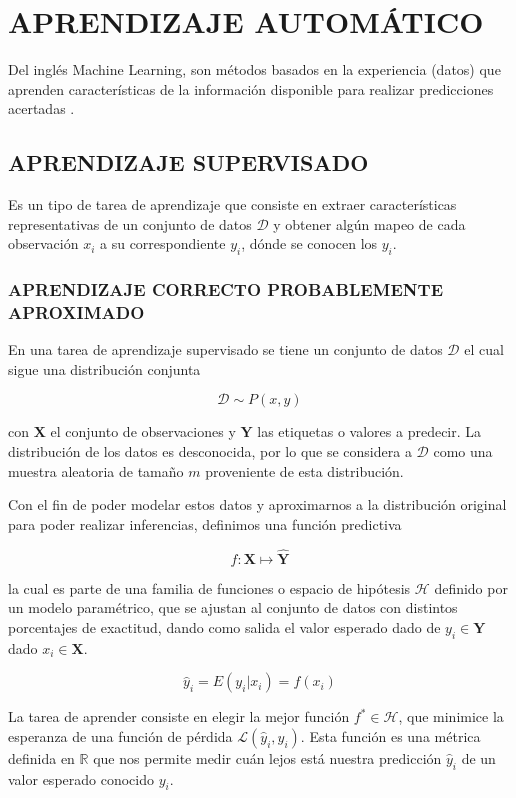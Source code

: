\section{APRENDIZAJE AUTOMÁTICO}
    Del inglés Machine Learning, son métodos basados en la experiencia (datos) que aprenden características de la información disponible para realizar predicciones acertadas \citep{10.5555/3360093}.
    \subsection{APRENDIZAJE SUPERVISADO}
        Es un tipo de tarea de aprendizaje que consiste en extraer características representativas de un conjunto de datos $\mathcal{D}$ y obtener algún mapeo de cada observación $x_i$ a su correspondiente $y_i$, dónde se conocen los $y_i$.
    
        \subsubsection{APRENDIZAJE CORRECTO PROBABLEMENTE APROXIMADO}
        En una tarea de aprendizaje supervisado se tiene un conjunto de datos $\mathcal{D}$ el cual sigue una distribución conjunta
        
        $$\mathcal{D} \sim P(x, y)$$
        
        \noindent con $\mathbf{X}$ el conjunto de observaciones y $\mathbf{Y}$ las etiquetas o valores a predecir. La distribución de los datos es desconocida, por lo que se considera a $\mathcal{D}$ como una muestra aleatoria de tamaño $m$ proveniente de esta distribución.
        
        Con el fin de poder modelar estos datos y aproximarnos a la distribución original para poder realizar inferencias, definimos una función predictiva
        
        $$f: \mathbf{X} \mapsto \mathbf{\hat{Y}}$$
        
        \noindent la cual es parte de una familia de funciones o espacio de hipótesis $\mathcal{H}$ definido por un modelo paramétrico, que se ajustan al conjunto de datos con distintos porcentajes de exactitud, dando como salida el valor esperado dado de $y_i \in \mathbf{Y}$ dado $x_i \in \mathbf{X}$.
        
        $$\hat{y}_i = E(y_i|x_i) = f(x_i)$$
        
        La tarea de aprender consiste en elegir la mejor función $f^* \in \mathcal{H}$, que minimice la esperanza de una función de pérdida $\mathcal{L}(\hat{y}_i, y_i)$. Esta función es una métrica definida en $\mathbb{R}$ que nos permite medir cuán lejos está nuestra predicción $\hat{y}_i$ de un valor esperado conocido $y_i$.
        
